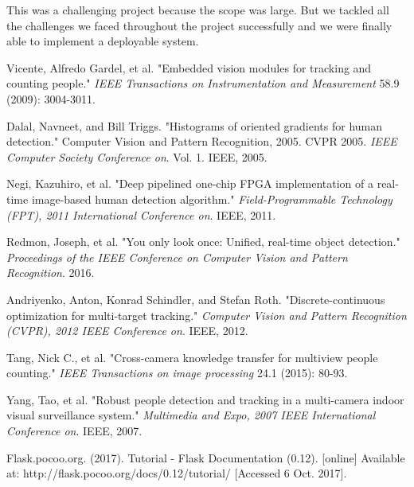 \documentclass[12pt,a4paper]{report}
\begin{document}
\par This was a challenging project because the scope was large. But we tackled all the challenges we faced throughout the project successfully and we were finally able to implement a deployable system. 




\newpage
\begin{thebibliography}{10}

Vicente, Alfredo Gardel, et al. "Embedded vision modules for tracking and counting people." \textit{IEEE Transactions on Instrumentation and Measurement} 58.9 (2009): 3004-3011.

Dalal, Navneet, and Bill Triggs. "Histograms of oriented gradients for human detection." Computer Vision and Pattern Recognition, 2005. CVPR 2005. \textit{IEEE Computer Society Conference on}. Vol. 1. IEEE, 2005.

Negi, Kazuhiro, et al. "Deep pipelined one-chip FPGA implementation of a real-time image-based human detection algorithm." \textit{Field-Programmable Technology (FPT), 2011 International Conference on}. IEEE, 2011.

Redmon, Joseph, et al. "You only look once: Unified, real-time object detection." \textit{Proceedings of the IEEE Conference on Computer Vision and Pattern Recognition}. 2016.

Andriyenko, Anton, Konrad Schindler, and Stefan Roth. "Discrete-continuous optimization for multi-target tracking." \textit{Computer Vision and Pattern Recognition (CVPR), 2012 IEEE Conference on}. IEEE, 2012.

Tang, Nick C., et al. "Cross-camera knowledge transfer for multiview people counting." \textit{IEEE Transactions on image processing} 24.1 (2015): 80-93.

Yang, Tao, et al. "Robust people detection and tracking in a multi-camera indoor visual surveillance system." \textit{Multimedia and Expo, 2007 IEEE International Conference on}. IEEE, 2007.

Flask.pocoo.org. (2017). Tutorial - Flask Documentation (0.12). [online] Available at: http://flask.pocoo.org/docs/0.12/tutorial/ [Accessed 6 Oct. 2017].


\end{thebibliography}
\end{document}
